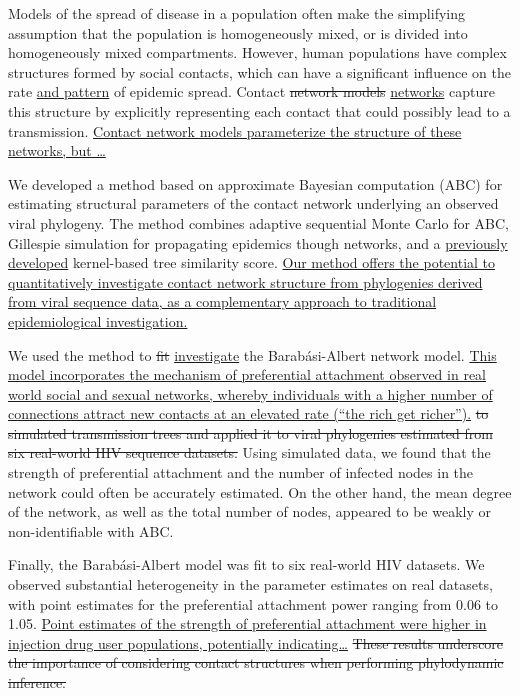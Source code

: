 Models of the spread of disease in a population often make the simplifying
assumption that the population is homogeneously mixed, or is divided into
homogeneously mixed compartments. However, human populations have complex
structures formed by social contacts, which can have a significant influence on
the rate {\color{blue}\uline{and pattern}} of epidemic spread. Contact
{\color{red}\sout{network models}} {\color{blue}\uline{networks}} capture this
structure by explicitly representing each contact that could possibly lead to a
transmission. {\color{blue}\uline{Contact network models parameterize the
structure of these networks, but \ldots }}

We developed a method based on approximate Bayesian computation (ABC) for
estimating structural parameters of the contact network underlying an
observed viral phylogeny. The method combines adaptive sequential Monte Carlo
for ABC, Gillespie simulation for propagating epidemics though networks, and a
{\color{blue}\uline{previously developed}} kernel-based tree similarity score.
{\color{blue}\uline{Our method offers the potential to quantitatively
investigate contact network structure from phylogenies derived from viral
sequence data, as a complementary approach to traditional epidemiological
investigation.}}

We used the method to {\color{red}\sout{fit}}
{\color{blue}\uline{investigate}} the Barab\'{a}si-Albert network model.
{\color{blue}\uline{This model incorporates the mechanism of preferential
attachment observed in real world social and sexual networks, whereby
individuals with a higher number of connections attract new contacts at an
elevated rate (``the rich get richer'').}}
{\color{red}\sout{to simulated transmission trees and applied it to viral
phylogenies estimated from six real-world HIV sequence datasets.}} Using
simulated data, we found that the strength of preferential attachment and the
number of infected nodes in the network could often be accurately estimated. On
the other hand, the mean degree of the network, as well as the total number of
nodes, appeared to be weakly or non-identifiable with ABC. 

Finally, the Barab\'{a}si-Albert model was fit to six real-world HIV datasets.
We observed substantial heterogeneity in the parameter estimates on real
datasets, with point estimates for the preferential attachment power ranging
from 0.06 to 1.05. 
{\color{blue}\uline{Point estimates of the strength of preferential attachment 
were higher in injection drug user populations, potentially indicating\ldots}}
{\color{red}\sout{These results underscore the importance of considering
contact structures when performing phylodynamic inference.}}
